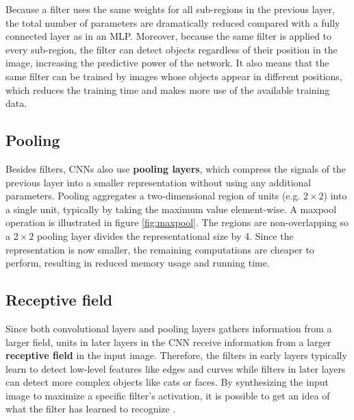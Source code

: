 
Because a filter uses the same weights for all sub-regions in the previous layer, the total number of parameters are dramatically reduced compared with a fully connected layer as in an MLP. Moreover, because the same filter is applied to every sub-region, the filter can detect objects regardless of their position in the image, increasing the predictive power of the network.
It also means that the same filter can be trained by images whose objects appear in different positions, which reduces the training time and makes more use of the available training data.

\subsection{Pooling}


Besides filters, CNNs also use \textbf{pooling layers}, which compress the signals of the previous layer into a smaller representation without using any additional parameters.
Pooling aggregates a two-dimensional region of units (e.g. $2 \times 2$) into a single unit, typically by taking the maximum value element-wise. A maxpool operation is illustrated in figure \ref{fig:maxpool}.
The regions are non-overlapping so a $2 \times 2$ pooling layer divides the representational size by 4.
Since the representation is now smaller, the remaining computations are cheaper to perform, resulting in reduced memory usage and running time.

\subsection{Receptive field}
Since both convolutional layers and pooling layers gathers information from a larger field, units in later layers in the CNN receive information from a larger \textbf{receptive field} in the input image.
Therefore, the filters in early layers typically learn to detect low-level features like edges and curves while filters in later layers can detect more complex objects like cats or faces.
By synthesizing the input image to maximize a specific filter's activation, it is possible to get an idea of what the filter has learned to recognize \cite{VisualizeCnn}.

